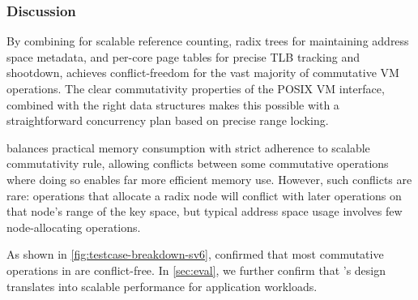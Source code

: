 
\subsubsection{Discussion}

By combining  for scalable reference counting, radix trees
for maintaining address space metadata, and per-core page tables for
precise TLB tracking and shootdown, \vm achieves conflict-freedom for
the vast majority of commutative VM operations.  The clear
commutativity properties of the POSIX VM interface, combined with the
right data structures makes this possible with a straightforward
concurrency plan based on precise range locking.

\vm balances practical memory consumption with strict adherence to
scalable commutativity rule, allowing conflicts between some
commutative operations where doing so enables far more efficient
memory use.  However, such conflicts are rare: operations that
allocate a radix node will conflict with later operations on that
node's range of the key space, but typical address space usage
involves few node-allocating operations.

As shown in \cref{fig:testcase-breakdown-sv6}, \tool confirmed that
most commutative operations in \vm are conflict-free.  In
\cref{sec:eval}, we further confirm that \vm's design translates into
scalable performance for application workloads.
